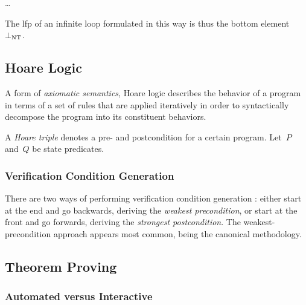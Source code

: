 \todo\dots

The \ac{lfp} of an infinite loop formulated in this way
is thus the bottom element $\bot_\mathrm{NT}$.%

\subsection{Hoare Logic}\label{se:hoare}
A form of \emph{axiomatic semantics},
Hoare logic \autocite{hoare1969axiomatic,myreen2007hoare}%
describes the behavior of a program
in terms of a set of rules that are applied iteratively
in order to syntactically decompose the program into its constituent behaviors.

A \emph{Hoare triple} denotes a pre- and postcondition for a certain program.%
%
%
Let~$P$ and~$Q$ be state predicates.


\subsubsection{Verification Condition Generation}

There are two ways of performing verification condition generation%
:
either start at the end and go backwards, deriving the \emph{weakest precondition},%
or start at the front and go forwards, deriving the \emph{strongest postcondition}.%
The weakest-precondition approach appears most common,
being the canonical methodology.


\subsection{Theorem Proving}
%

\subsubsection{Automated versus Interactive}

